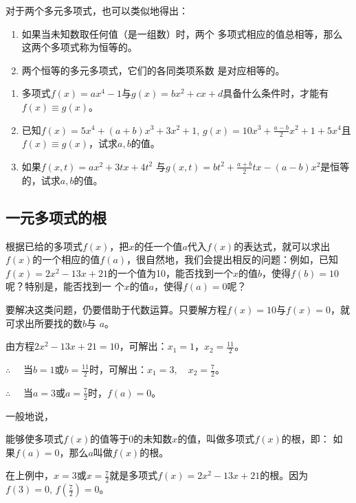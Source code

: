 对于两个多元多项式，也可以类似地得出：
\begin{blk}{}
    \begin{enumerate}
        \item 如果当未知数取任何值（是一组数）时，两个
        多项式相应的值总相等，那么这两个多项式称为恒等的。
        \item 
        两个恒等的多元多项式，它们的各同类项系数
        是对应相等的。
    \end{enumerate}
\end{blk}

\begin{ex}
    \begin{enumerate}
        \item 多项式$f(x)=ax^4-1$与$g(x)=bx^2+cx+d$具备什么条件时，才能有$f(x)\equiv g(x)$。
        \item 已知$f(x)=5x^4+(a+b)x^3+3x^2+1$, $g(x)=10x^3+\frac{a-b}{2}x^2+1+5x^4$且$f(x)\equiv g(x)$，试求$a,b$的值。
        \item 如果$f(x,t)=ax^2+3tx+4t^2$ 与$g(x,t)=bt^2+\frac{a+b}{2}tx-(a-b)x^2$是恒等的，试求$a,b$的值。
    \end{enumerate}
\end{ex}

\subsection{一元多项式的根}

根据已给的多项式$f(x)$，把$x$的任一个值$a$代入$f(x)$的表达式，就可以求出$f(x)$的一个相应的值$f(a)$，很自然地，我们会提出相反的问题：例如，已知$f(x)=2x^2-13x+21$的一个值为10，能否找到一个$x$的值$b$，使得$f(b)=10$呢？特别是，能否找到一
个$x$的值$a$，使得$f(a)=0$呢？

要解决这类问题，仍要借助于代数运算。只要解方程$f(x)=10$与$f(x)=0$，就可求出所要找的数$b$与
$a$。

由方程$2x^2-13x+21=10$，可解出：$x_1=1$，$x_2=\frac{11}{2}$。

$\therefore\quad $ 当$b=1$或$b=\frac{11}{2}$时，可解出：$x_1=3,\quad x_2=\frac{7}{2}$。

$\therefore\quad $ 当$a=3$或$a=\frac{7}{2}$时，$f(a)=0$。

一般地说，
\begin{blk}{}
    能够使多项式$f(x)$的值等于0的未知数$x$的值，叫做多项式$f(x)$的根，即：
如果$f(a)=0$，那么$a$叫做$f(x)$的根。
\end{blk}


在上例中，$x=3$或$x=\frac{7}{2}$就是多项式$f(x)=2x^2-13x+21$的根。因为$f(3)=0$, $f\left(\frac{7}{2}\right) =0$。

